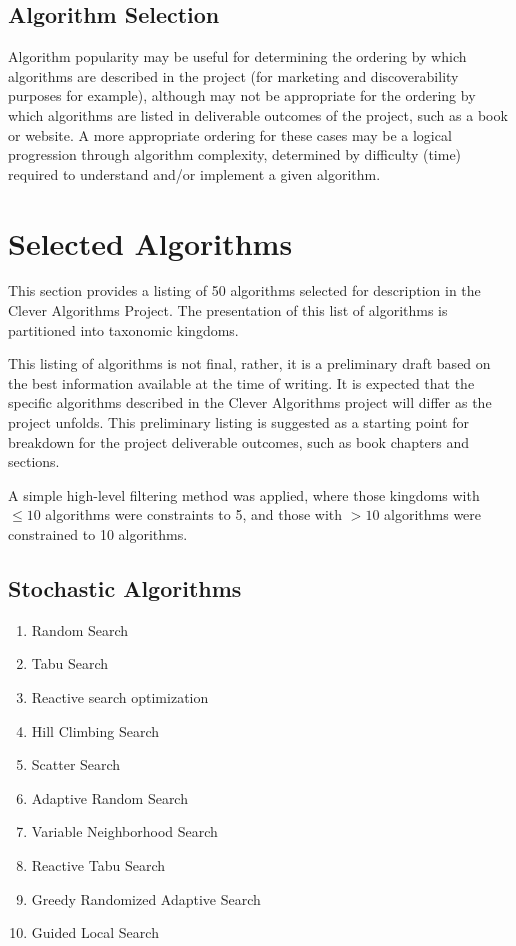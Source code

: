 \documentclass[a4paper, 11pt]{article}
\begin{document}
\subsection{Algorithm Selection}
Algorithm popularity may be useful for determining the ordering by which algorithms are described in the project (for marketing and discoverability purposes for example), although may not be appropriate for the ordering by which algorithms are listed in deliverable outcomes of the project, such as a book or website. A more appropriate ordering for these cases may be a logical progression through algorithm complexity, determined by difficulty (time) required to understand and/or implement a given algorithm.  

% 
% 
\section{Selected Algorithms}
\label{sec:selection}
This section provides a listing of 50 algorithms selected for description in the Clever Algorithms Project. The presentation of this list of algorithms is partitioned into taxonomic kingdoms. 

This listing of algorithms is not final, rather, it is a preliminary draft based on the best information available at the time of writing. It is expected that the specific algorithms described in the Clever Algorithms project will differ as the project unfolds. This preliminary listing is suggested as a starting point for breakdown for the project deliverable outcomes, such as book chapters and sections.

A simple high-level filtering method was applied, where those kingdoms with $\leq 10$ algorithms were constraints to 5, and those with $>10$ algorithms were constrained to 10 algorithms.

\subsection{Stochastic Algorithms}

\begin{enumerate}
	\item Random Search
	\item Tabu Search
	\item Reactive search optimization
	\item Hill Climbing Search
	\item Scatter Search
	\item Adaptive Random Search
	\item Variable Neighborhood Search
	\item Reactive Tabu Search
	\item Greedy Randomized Adaptive Search
	\item Guided Local Search
\end{enumerate}
\end{document}
